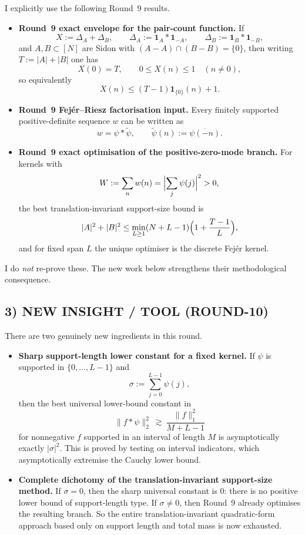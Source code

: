 I explicitly use the following Round~9 results.
\begin{itemize}
\item \textbf{Round~9 exact envelope for the pair-count function.} If
\[
X:=\Delta_A+\Delta_B,
\qquad
\Delta_A:=\mathbf 1_A*\mathbf 1_{-A},
\qquad
\Delta_B:=\mathbf 1_B*\mathbf 1_{-B},
\]
and \(A,B\subset[N]\) are Sidon with \((A-A)\cap(B-B)=\{0\}\), then writing \(T:=|A|+|B|\) one has
\[
X(0)=T,
\qquad
0\le X(n)\le 1\quad (n\ne 0),
\]
so equivalently
\[
X(n)\le (T-1)\mathbf 1_{\{0\}}(n)+1.
\]
\item \textbf{Round~9 Fej\'er--Riesz factorisation input.} Every finitely supported positive-definite sequence \(w\) can be written as
\[
w=\psi*\widetilde \psi,
\qquad \widetilde \psi(n):=\overline{\psi(-n)}.
\]
\item \textbf{Round~9 exact optimisation of the positive-zero-mode branch.} For kernels with
\[
W:=\sum_n w(n)=\Bigl|\sum_j \psi(j)\Bigr|^2>0,
\]
the best translation-invariant support-size bound is
\[
|A|^2+|B|^2\le \min_{L\ge 1}(N+L-1)\Bigl(1+\frac{T-1}{L}\Bigr),
\]
and for fixed span \(L\) the unique optimiser is the discrete Fej\'er kernel.
\end{itemize}
I do \emph{not} re-prove these. The new work below strengthens their methodological consequence.

\subsection{3) NEW INSIGHT / TOOL (ROUND-10)}

There are two genuinely new ingredients in this round.
\begin{itemize}
\item \textbf{Sharp support-length lower constant for a fixed kernel.} If \(\psi\) is supported in \(\{0,\dots,L-1\}\) and
\[
\sigma:=\sum_{j=0}^{L-1}\psi(j),
\]
then the best universal lower-bound constant in
\[
\|f*\psi\|_2^2\ \gtrsim\ \frac{\|f\|_1^2}{M+L-1}
\]
for nonnegative \(f\) supported in an interval of length \(M\) is asymptotically exactly \(|\sigma|^2\). This is proved by testing on interval indicators, which asymptotically extremise the Cauchy lower bound.

\item \textbf{Complete dichotomy of the translation-invariant support-size method.} If \(\sigma=0\), then the sharp universal constant is \(0\): there is no positive lower bound of support-length type. If \(\sigma\ne 0\), then Round~9 already optimises the resulting branch. So the entire translation-invariant quadratic-form approach based only on support length and total mass is now exhausted.
\end{itemize}

